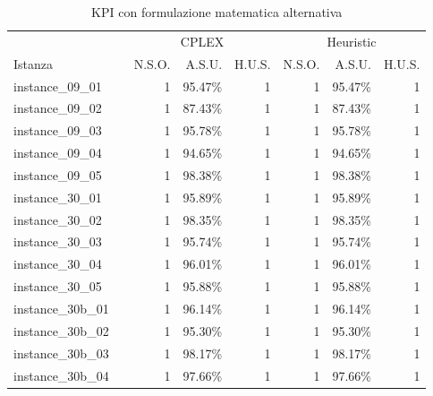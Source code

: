 \documentclass[12pt,a4paper,openright,twoside]{book}
\begin{document}
\begin{table}[H]
\centering
\caption{KPI con formulazione matematica alternativa}
\label{tab.r222}
\small
\begin{tabular}{|ll|rrr|rrr|} 
\hline

\multicolumn{2}{|c|}{   } & 
\multicolumn{3}{c|}{CPLEX} &     
\multicolumn{3}{c|}{Heuristic} \\  
Istanza  &   &                        N.S.O. &  A.S.U.   &  H.U.S.  & N.S.O. &  A.S.U.   &  H.U.S. \\ 
\hline
 instance\_09\_01             &     &    1  &      95.47\%  &   1     &    1  &      95.47\%  &   1      \\ 
 instance\_09\_02             &     &    1  &      87.43\%  &   1     &    1  &      87.43\%  &   1     \\
 instance\_09\_03             &     &    1  &      95.78\%  &   1     &    1  &      95.78\%  &   1      \\ 
 instance\_09\_04             &     &    1  &      94.65\%  &   1     &    1  &      94.65\%  &   1      \\ 
 instance\_09\_05             &     &    1  &      98.38\%  &   1     &    1  &      98.38\%  &   1    \\
 instance\_30\_01             &     &    1  &      95.89\%  &   1     &    1  &      95.89\%  &   1  \\
 instance\_30\_02             &     &    1  &      98.35\%  &   1     &    1  &      98.35\%  &   1  \\
 instance\_30\_03             &     &    1  &      95.74\%  &   1     &    1  &      95.74\%  &   1  \\
 instance\_30\_04             &     &    1  &      96.01\%  &   1     &    1  &      96.01\%  &   1  \\
 instance\_30\_05             &     &    1  &      95.88\%  &   1     &    1  &      95.88\%  &   1  \\
 instance\_30b\_01             &     &    1   &     96.14\%  &  1      &    1   &     96.14\%  &  1          \\     
 instance\_30b\_02             &     &    1   &     95.30\%  &  1      &    1   &     95.30\%  &  1          \\     
 instance\_30b\_03             &     &    1   &     98.17\%  &  1      &    1   &     98.17\%  &  1          \\     
 instance\_30b\_04             &     &    1   &     97.66\%  &  1      &    1   &     97.66\%  &  1          \\     

\end{tabular}
\end{table}
\end{document}
